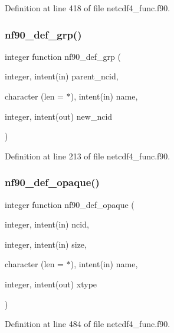 Definition at line 418 of file netcdf4\+\_\+func.\+f90.

\mbox{\label{netcdf4__func_8f90_a183abbd603d7ab7468178b26da33de37}} 
\subsubsection{\texorpdfstring{nf90\+\_\+def\+\_\+grp()}{nf90\_def\_grp()}}
{\footnotesize\ttfamily integer function nf90\+\_\+def\+\_\+grp (\begin{DoxyParamCaption}\item[{integer, intent(in)}]{parent\+\_\+ncid,  }\item[{character (len = $\ast$), intent(in)}]{name,  }\item[{integer, intent(out)}]{new\+\_\+ncid }\end{DoxyParamCaption})}



Definition at line 213 of file netcdf4\+\_\+func.\+f90.

\mbox{\label{netcdf4__func_8f90_a227ebda215dc96ed0af9912c7ad47b7a}} 
\subsubsection{\texorpdfstring{nf90\+\_\+def\+\_\+opaque()}{nf90\_def\_opaque()}}
{\footnotesize\ttfamily integer function nf90\+\_\+def\+\_\+opaque (\begin{DoxyParamCaption}\item[{integer, intent(in)}]{ncid,  }\item[{integer, intent(in)}]{size,  }\item[{character (len = $\ast$), intent(in)}]{name,  }\item[{integer, intent(out)}]{xtype }\end{DoxyParamCaption})}



Definition at line 484 of file netcdf4\+\_\+func.\+f90.

